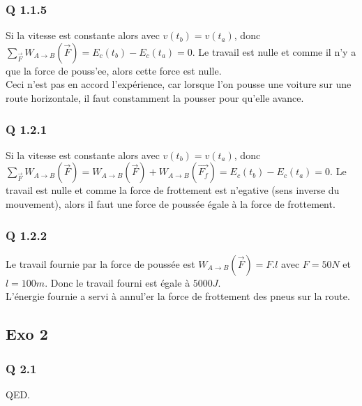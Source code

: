 \documentclass[]{book}
\theoremstyle{definition}
\begin{document}
\subsubsection*{Q 1.1.5}
Si la vitesse est constante alors avec $v(t_b) = v(t_a)$, donc $\sum_{\overrightarrow{F}}W_{A \to B}(\overrightarrow{F}) = E_c(t_b) - E_c(t_a) = 0$. Le travail est nulle et comme il n'y a que la force de pouss'ee, alors cette force est nulle.\\

Ceci n'est pas en accord l'exp\'erience, car lorsque l'on pousse une voiture sur une route horizontale, il faut constamment la pousser pour qu'elle avance. 

\subsubsection*{Q 1.2.1}
Si la vitesse est constante alors avec $v(t_b) = v(t_a)$, donc $\sum_{\overrightarrow{F}}W_{A \to B}(\overrightarrow{F}) = W_{A \to B}(\overrightarrow{F}) + W_{A \to B}(\overrightarrow{F_f}) = E_c(t_b) - E_c(t_a) = 0$. Le travail est nulle et comme la force de frottement est n'egative (sens inverse du mouvement), alors il faut une force de pouss\'ee \'egale \`a la force de frottement.\\

\subsubsection*{Q 1.2.2}
Le travail fournie par la force de pouss\'ee est $W_{A \to B}(\overrightarrow{F}) = F.l$ avec $F = 50N$ et $l=100m$. Donc le travail fourni est \'egale \`a $5000J$.\\
L'\'energie fournie a servi \`a annul'er la force de frottement des pneus sur la route.

\subsection*{Exo 2}
\subsubsection*{Q 2.1}


QED.
\end{document}
